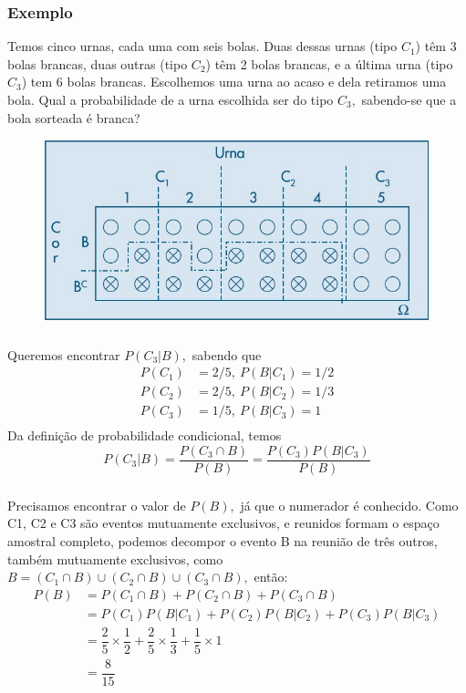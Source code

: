 \documentclass[14pt,aspectratio=1610]{beamer}
\begin{document}
\begin{frame}{}
\frametitle{Exemplo}
\small
  \begin{block}{}
  \justifying
Temos cinco urnas, cada uma com seis bolas. Duas dessas urnas (tipo $C_1$) têm 3 bolas brancas, duas outras (tipo $C_2$) têm 2 bolas brancas, e a última urna (tipo $C_3$) tem 6 bolas brancas. Escolhemos uma urna ao acaso e dela retiramos uma bola. Qual a probabilidade de a urna escolhida ser do tipo $C_3,$ sabendo-se que a bola sorteada é branca?
\end{block}
\vspace{-0.5cm}
    \begin{figure}[H]
    \centering
    \includegraphics[height=0.3\textwidth,width=15cm]{figs/ex5_14}
    \end{figure}
  
\end{frame}


\begin{frame}{}
\frametitle{}
\begin{block}{}
\justifying
Queremos encontrar $P(C_3|B),$ sabendo que
\begin{align*}
P(C_{1})&=2/5,\ P(B|C_{1})=1/2\\
P(C_{2})&=2/5,\ P(B|C_{2})=1/3\\
P(C_{3})&=1/5,\ P(B|C_{3})=1\\
\end{align*}
Da definição de probabilidade condicional, temos
$$P(C_{3}|B)=\dfrac{P(C_{3}\cap B)}{P(B)}=\dfrac{P(C_{3})P(B|C_{3})}{P(B)}$$
\end{block}
\end{frame}

\begin{frame}{}
\frametitle{}
\begin{block}{}
\justifying
Precisamos encontrar o valor de $P(B),$ já que o numerador é conhecido. Como C1,
C2 e C3 são eventos mutuamente exclusivos, e reunidos formam o espaço amostral
completo, podemos decompor o evento B na reunião de três outros, também mutuamente
exclusivos, como $B=(C_{1}\cap B)\cup (C_{2}\cap B)\cup (C_{3}\cap B),$ então:
\begin{align*}
P(B)&=P(C_{1}\cap B)+P(C_{2}\cap B)+P(C_{3}\cap B)\\
&=P(C_{1})P(B|C_{1})+P(C_{2})P(B|C_{2})+P(C_{3})P(B|C_{3})\\
&=\dfrac{2}{5}\times \dfrac{1}{2}+\dfrac{2}{5}\times \dfrac{1}{3}+\dfrac{1}{5}\times 1\\
&=\dfrac{8}{15}
\end{align*}
\end{block}
\end{frame}
\end{document}
